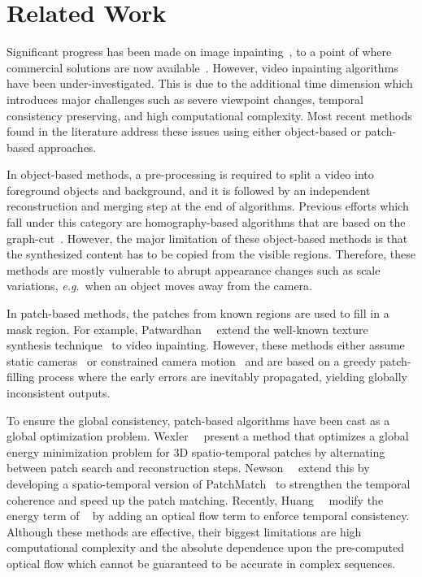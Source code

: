 \documentclass[10pt,twocolumn,letterpaper]{article}
\renewcommand{\eg}{\textit{e.g.}}
\begin{document}
\section{Related Work}
\label{sec:related}

Significant progress has been made on image inpainting~\cite{ballester2001filling,bertalmio2000image,efros1999texture,pathak2016context,yang2017high,yeh2017semantic,iizuka2017globally,yu2018generative,liu2018image,yu2018free}, to a point of where commercial solutions are now available~\cite{barnes2009patchmatch}. However, video inpainting algorithms have been under-investigated. This is due to the additional time dimension which introduces major challenges such as severe viewpoint changes, temporal consistency preserving, and high computational complexity. Most recent methods found in the literature address these issues using either object-based or patch-based approaches.

In object-based methods, a pre-processing is required to split a video into foreground objects and background, and it is followed by an independent reconstruction and merging step at the end of algorithms. Previous efforts which fall under this category are homography-based algorithms that are based on the graph-cut~\cite{granados2012not,granados2012background}. However, the major limitation of these object-based methods is that the synthesized content has to be copied from the visible regions. Therefore, these methods are mostly vulnerable to abrupt appearance changes such as scale variations, \eg~when an object moves away from the camera.

In patch-based methods, the patches from known regions are used to fill in a mask region. For example, Patwardhan~\etal~\cite{patwardhan2005video,patwardhan2007video} extend the well-known texture synthesis technique~\cite{efros1999texture} to video inpainting. However, these methods either assume static cameras~\cite{patwardhan2005video} or constrained camera motion~\cite{patwardhan2007video} and are based on a greedy patch-filling process where the early errors are inevitably propagated, yielding globally inconsistent outputs.

To ensure the global consistency, patch-based algorithms have been cast as a global optimization problem. Wexler~\etal~\cite{wexler2004space} present a method that optimizes a global energy minimization problem for 3D spatio-temporal patches by alternating between patch search and reconstruction steps. Newson~\etal~\cite{newson2014video} extend this by developing a spatio-temporal version of PatchMatch~\cite{barnes2009patchmatch} to strengthen the temporal coherence and speed up the patch matching. Recently, Huang~\etal~\cite{huang2016temporally} modify the energy term of ~\cite{wexler2004space} by adding an optical flow term to enforce temporal consistency. Although these methods are effective, their biggest limitations are high computational complexity and the absolute dependence upon the pre-computed optical flow which cannot be guaranteed to be accurate in complex sequences.
\end{document}
